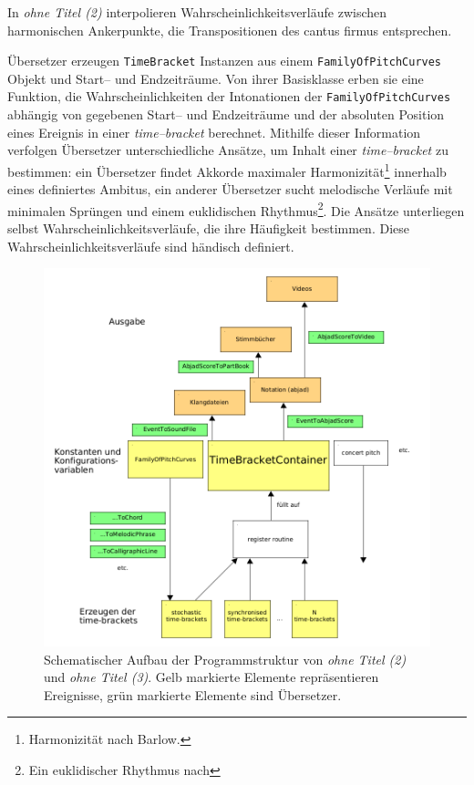 \documentclass[12pt,a4paper,ngerman]{article}
\begin{document}
\smallskip

In \emph{ohne Titel (2)} interpolieren Wahrscheinlichkeitsverläufe zwischen harmonischen Ankerpunkte, die Transpositionen des cantus firmus entsprechen.

\smallskip

Übersetzer erzeugen \texttt{TimeBracket} Instanzen aus einem \texttt{FamilyOfPitchCurves} Objekt und Start-- und Endzeiträume.
Von ihrer Basisklasse erben sie eine Funktion, die Wahrscheinlichkeiten der Intonationen der \texttt{FamilyOfPitchCurves} abhängig von gegebenen Start-- und Endzeiträume und der absoluten Position eines Ereignis in einer \emph{time--bracket} berechnet.
Mithilfe dieser Information verfolgen Übersetzer unterschiedliche Ansätze, um Inhalt einer \emph{time--bracket} zu bestimmen:
ein Übersetzer findet Akkorde maximaler Harmonizität\footnote{%
    Harmonizität nach Barlow.
} innerhalb eines definiertes Ambitus,
ein anderer Übersetzer sucht melodische Verläufe mit minimalen Sprüngen und einem euklidischen Rhythmus\footnote{%
    Ein euklidischer Rhythmus nach
}.
Die Ansätze unterliegen selbst Wahrscheinlichkeitsverläufe, die ihre Häufigkeit bestimmen.
Diese Wahrscheinlichkeitsverläufe sind händisch definiert.

\begin{figure}[h!]
    \begin{center}
        \includegraphics[scale=0.45]{pictures/ohne-titel-mutwo-structure.png}
    \end{center}
    \caption{%
        Schematischer Aufbau der Programmstruktur von \emph{ohne Titel (2)} und  \emph{ohne Titel (3)}.
        Gelb markierte Elemente repräsentieren Ereignisse, grün markierte Elemente sind Übersetzer.
    }
    \label{fig:ohneTitelMutwoStructure}
\end{figure}
\end{document}
